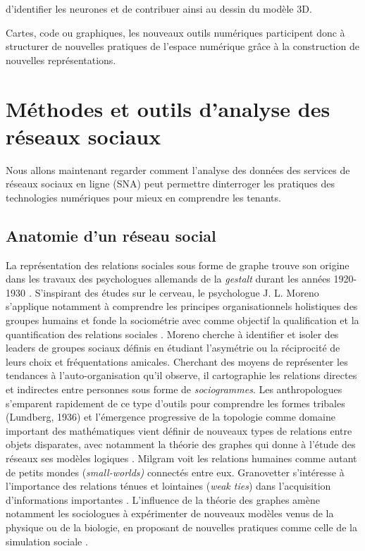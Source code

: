 d{\textquoteright}identifier les neurones et de contribuer ainsi au dessin du modèle 3D.

Cartes, code ou graphiques, les nouveaux outils numériques participent donc à structurer de nouvelles pratiques de l{\textquoteright}espace numérique gr\^ace à la construction de nouvelles représentations. 

\section[Méthodes et outils d{\textquoteright}analyse des réseaux sociaux]{Méthodes et outils d{\textquoteright}analyse des réseaux sociaux}

Nous allons maintenant regarder comment l{\textquoteright}analyse des données des services de réseaux sociaux en ligne (SNA) peut permettre d{\textquotesingle}interroger les pratiques des technologies numériques pour mieux en comprendre les tenants. 


\subsection[Anatomie d{\textquoteright}un réseau social]{ Anatomie d{\textquoteright}un réseau social}

La représentation des relations sociales sous forme de graphe trouve son origine dans les travaux des psychologues allemands de la \textit{gestalt }durant les années 1920-1930 \citep{Scott1988}\textit{. }S{\textquoteright}inspirant des études sur le cerveau, le psychologue J. L. Moreno s{\textquoteright}applique notamment à comprendre les principes organisationnels holistiques des groupes humains et fonde la sociométrie avec comme objectif la qualification et la quantification des relations sociales \citep{Moreno1938}. Moreno cherche à identifier et isoler des leaders de groupes sociaux définis en étudiant l{\textquoteright}asymétrie ou la réciprocité de leurs choix et fréquentations amicales. Cherchant des moyens de représenter les tendances à l{\textquoteright}auto-organisation qu{\textquoteright}il observe, il cartographie les relations directes et indirectes entre personnes sous forme de \textit{sociogrammes}. Les anthropologues s{\textquoteright}emparent rapidement de ce type d{\textquoteright}outils pour comprendre les formes tribales (Lundberg, 1936) et l{\textquoteright}émergence progressive de la topologie comme domaine important des mathématiques vient définir de nouveaux types de relations entre objets disparates, avec notamment la théorie des graphes qui donne à l{\textquoteright}étude des réseaux ses modèles logiques \citep{Harary1977}. Milgram \citep{Travers1969} voit les relations humaines comme autant de petits mondes (\textit{small-worlds)} connectés entre eux. Granovetter s{\textquoteright}intéresse à l{\textquoteright}importance des relations ténues et lointaines (\textit{weak ties}) dans l{\textquoteright}acquisition d{\textquoteright}informations importantes \citep{Granovetter1973}. L{\textquoteright}influence de la théorie des graphes amène notamment les sociologues à expérimenter de nouveaux modèles venus de la physique ou de la biologie, en proposant de nouvelles pratiques comme celle de la simulation sociale \citep{Epstein1996}. 


